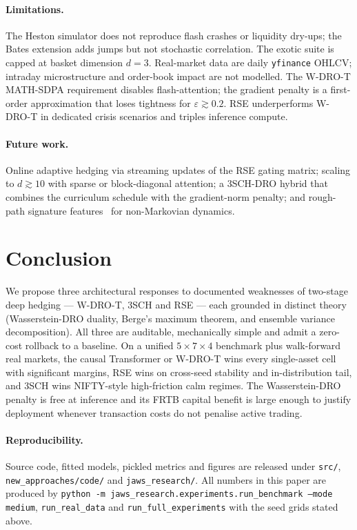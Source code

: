 \documentclass[11pt]{article}
\begin{document}
\paragraph{Limitations.}  The Heston simulator does not reproduce flash crashes or liquidity dry-ups; the Bates extension adds jumps but not stochastic correlation.  The exotic suite is capped at basket dimension $d=3$.  Real-market data are daily \texttt{yfinance} OHLCV; intraday microstructure and order-book impact are not modelled.  The W-DRO-T MATH-SDPA requirement disables flash-attention; the gradient penalty is a first-order approximation that loses tightness for $\varepsilon\gtrsim 0.2$.  RSE underperforms W-DRO-T in dedicated crisis scenarios and triples inference compute.

\paragraph{Future work.}  Online adaptive hedging via streaming updates of the RSE gating matrix; scaling to $d\gtrsim 10$ with sparse or block-diagonal attention; a 3SCH-DRO hybrid that combines the curriculum schedule with the gradient-norm penalty; and rough-path signature features~\citep{lyons1998differential,kidger2020signatory} for non-Markovian dynamics.

\section{Conclusion}\label{sec:conclusion}

We propose three architectural responses to documented weaknesses of two-stage deep hedging --- W-DRO-T, 3SCH and RSE --- each grounded in distinct theory (Wasserstein-DRO duality, Berge's maximum theorem, and ensemble variance decomposition).  All three are auditable, mechanically simple and admit a zero-cost rollback to a baseline.  On a unified $5{\times}7{\times}4$ benchmark plus walk-forward real markets, the causal Transformer or W-DRO-T wins every single-asset cell with significant margins, RSE wins on cross-seed stability and in-distribution tail, and 3SCH wins NIFTY-style high-friction calm regimes.  The Wasserstein-DRO penalty is free at inference and its FRTB capital benefit is large enough to justify deployment whenever transaction costs do not penalise active trading.

\paragraph{Reproducibility.}  Source code, fitted models, pickled metrics and figures are released under \texttt{src/}, \texttt{new\_approaches/code/} and \texttt{jaws\_research/}.  All numbers in this paper are produced by \texttt{python -m jaws\_research.experiments.run\_benchmark --mode medium}, \texttt{run\_real\_data} and \texttt{run\_full\_experiments} with the seed grids stated above.



\end{document}
